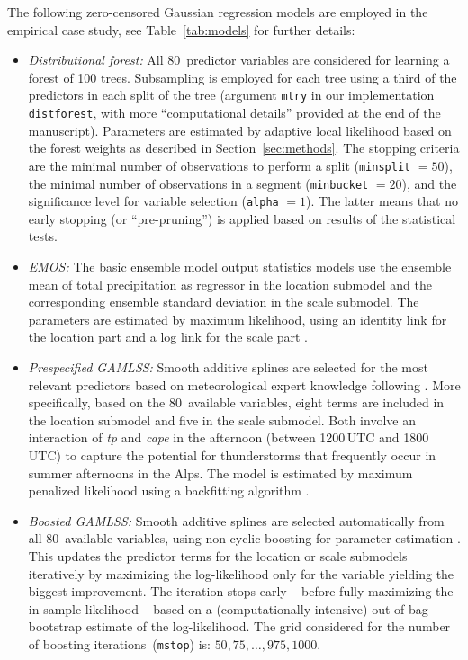 \documentclass[aoas, preprint]{imsart}
\numberwithin{equation}{subsection}
\begin{document}
The following zero-censored Gaussian regression models are employed
in the empirical case study, see Table~\ref{tab:models} for
further details:
%
\begin{itemize}

\item \emph{Distributional forest:} All 80~predictor variables are
  considered for learning a forest of 100 trees. Subsampling is employed 
  for each tree using a third of the predictors in each split of the tree
  (argument \texttt{mtry} in our implementation \texttt{distforest},
  with more ``computational details'' provided at the end of the manuscript).
  Parameters are estimated by
  adaptive local likelihood based on the forest weights as described
  in Section~\ref{sec:methods}. 
  The stopping criteria are the minimal number of observations to perform a split 
  (\texttt{minsplit} $= 50$), the minimal number of observations in a 
  segment (\texttt{minbucket} $= 20$), and the significance level 
  for variable selection (\texttt{alpha} $= 1$). The latter means
  that no early stopping (or ``pre-pruning'') is applied
  based on results of the statistical tests.

\item \emph{EMOS:} The basic ensemble model output statistics
  models use the ensemble mean of total precipitation as regressor in the location
  submodel and the corresponding ensemble standard deviation in the scale submodel.
  The parameters are estimated by maximum likelihood, using an identity
  link for the location part and a log link for the scale part
  \citep[following the advice of][]{Gebetsberger+Messner+Mayr:2017}.

\item \emph{Prespecified GAMLSS:} Smooth additive splines are selected for
  the most relevant predictors based on meteorological expert knowledge
  following \cite{Stauffer+Umlauf+Messner:2017}. More specifically, based
  on the 80~available variables, eight terms are included in the location
  submodel and five in the scale submodel. Both involve an interaction of
  \emph{tp} and \emph{cape} in the afternoon (between 1200\,UTC and 1800\,UTC)
  to capture the potential for thunderstorms that frequently occur in
  summer afternoons in the Alps. The model is estimated by maximum
  penalized likelihood using a backfitting algorithm \citep{Stasinopoulos+Rigby:2007}.

\item \emph{Boosted GAMLSS:} Smooth additive splines are selected
  automatically from all 80~available variables, using non-cyclic boosting
  for parameter estimation \citep{Hofner+Mayr+Schmid:2016,Messner+Mayr+Zeileis:2017}.
  This updates the predictor terms for the location or scale submodels iteratively
  by maximizing the log-likelihood only for the variable yielding the
  biggest improvement. The iteration stops early -- before fully maximizing
  the in-sample likelihood -- based on a (computationally intensive)
  out-of-bag bootstrap estimate of the log-likelihood. The grid considered for
  the number of boosting iterations~(\texttt{mstop}) is: $50, 75, \dots, 975, 1000$.

\end{itemize}
\end{document}
